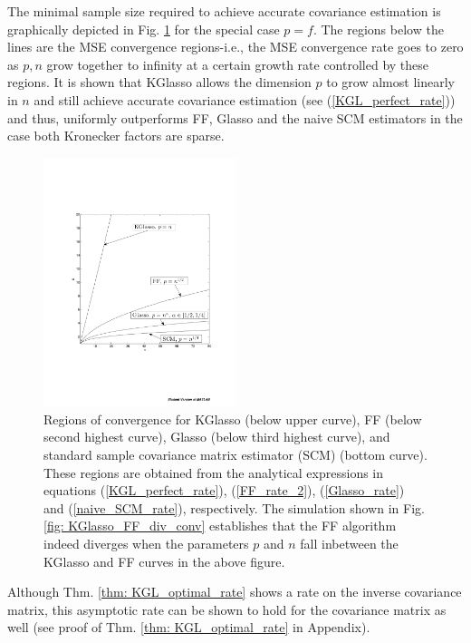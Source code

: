\documentclass[journal,11pt,draftcls,onecolumn]{IEEEtran}
\begin{document}
The minimal sample size required to achieve accurate covariance estimation is graphically depicted in Fig. \ref{fig: visRate} for the special case $p=f$. The regions below the lines are the MSE convergence regions-i.e., the MSE convergence rate goes to zero as $p,n$ grow together to infinity at a certain growth rate controlled by these regions. It is shown that KGlasso allows the dimension $p$ to grow almost linearly in $n$ and still achieve accurate covariance estimation (see (\ref{KGL_perfect_rate})) and thus, uniformly outperforms FF, Glasso and the naive SCM estimators in the case both Kronecker factors are sparse.
\begin{figure}[htp]
	\centering
		\includegraphics[width=0.50\textwidth]{./Sim/visRates.pdf}
	\caption{Regions of convergence for KGlasso (below upper curve), FF (below second highest curve), Glasso (below third highest curve), and standard sample covariance matrix estimator (SCM) (bottom curve). These regions are obtained from the analytical expressions in equations (\ref{KGL_perfect_rate}),  (\ref{FF_rate_2}), (\ref{Glasso_rate})  and  (\ref{naive_SCM_rate}), respectively. The simulation shown in Fig. \ref{fig: KGlasso_FF_div_conv} establishes that the FF algorithm indeed diverges when the parameters $p$ and $n$ fall inbetween the KGlasso and FF curves in the above figure.}
	\label{fig: visRate}
\end{figure}

Although Thm. \ref{thm: KGL_optimal_rate} shows a rate on the inverse covariance matrix, this asymptotic rate can be shown to hold for the covariance matrix as well (see proof of Thm. \ref{thm: KGL_optimal_rate} in Appendix).
\end{document}
